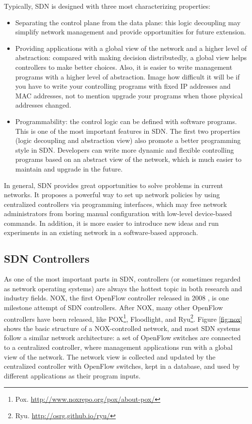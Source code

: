 \documentclass[english]{tktltiki}
\begin{document}
Typically, SDN is designed with three most characterizing properties:

\begin{itemize}
  \item Separating the control plane from the data plane: this logic decoupling may simplify network management and provide opportunities for future extension.
  \item Providing applications with a global view of the network and a higher level of abstraction: compared with making decision distributedly, a global view helps controllers to make better choices. Also, it is easier to write management programs with a higher level of abstraction. Image how difficult it will be if you have to write your controlling programs with fixed IP addresses and MAC addresses, not to mention upgrade your programs when those physical addresses changed.
  \item Programmability: the control logic can be defined with software programs. This is one of the most important features in SDN. The first two properties (logic decoupling and abstraction view) also promote a better programming style in SDN. Developers can write more dynamic and flexible controlling programs based on an abstract view of the network, which is much easier to maintain and upgrade in the future.
\end{itemize}

In general, SDN provides great opportunities to solve problems in current networks. It proposes a powerful way to set up network policies by using centralized controllers via programming interfaces, which may free network administrators from boring manual configuration with low-level device-based commands. In addition, it is more easier to introduce new ideas and run experiments in an existing network in a software-based approach.

\subsection{SDN Controllers}

As one of the most important parts in SDN, controllers (or sometimes regarded as network operating systems) are always the hottest topic in both research and industry fields. NOX, the first OpenFlow controller released in 2008 \cite{gkp+08}, is one milestone attempt of SDN controllers. After NOX, many other OpenFlow controllers have been released, like POX\footnote{Pox. \url{http://www.noxrepo.org/pox/about-pox/}}, Floodlight, and Ryu\footnote{Ryu. \url{http://osrg.github.io/ryu/}}. Figure \ref{fig:nox} shows the basic structure of a NOX-controlled network, and most SDN systems follow a similar network architecture: a set of OpenFlow switches are connected to a centralized controller, where management applications run with a global view of the network. The network view is collected and updated by the centralized controller with OpenFlow switches, kept in a database, and used by different applications as their program inputs.
\end{document}
